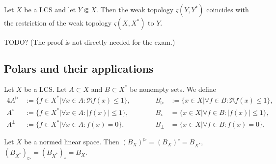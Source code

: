 \documentclass[12pt]{article}					%
\begin{document}
\begin{tvrzeni}
	Let $X$ be a LCS and let $Y \Subset X$. Then the weak topology $ς(Y, Y^*)$ coincides with the restriction of the weak topology $ς(X, X^*)$ to $Y$.

	\begin{dukazin}
		TODO? (The proof is not directly needed for the exam.)
	\end{dukazin}
\end{tvrzeni}

\subsection{Polars and their applications}
\begin{definice}
	Let $X$ be a LCS. Let $A \subset X$ and $B \subset X^*$ be nonempty sets. We define
	\begin{alignat*}{4}
		A^\triangleright &:= \{f \in X^* | \forall x \in A: \Re f(x) ≤ 1\}, \qquad && B_\triangleright &:= \{x \in X | \forall f \in B: \Re f(x) ≤ 1\},\\
		A^∘ &:= \{f \in X^* | \forall x \in A: |f(x)| ≤ 1\}, \qquad && B_∘ &= \{x \in X | \forall f \in B: |f(x)| ≤ 1\},\\
		A^\perp &:= \{f \in X^* | \forall x \in A: f(x) = 0\}, \qquad && B_\perp &= \{x \in X | \forall f \in B: f(x) = 0\}.
	\end{alignat*}
\end{definice}

\begin{priklad}
	Let $X$ be a normed linear space. Then $(B_X)^\triangleright = (B_X)^∘ = B_{X^*}$, $(B_{X^*})_\triangleright = (B_{X^*})_∘ = B_X$.
\end{priklad}
\end{document}
